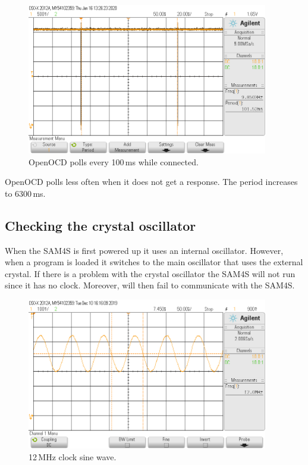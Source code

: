 \begin{figure}
\centering
\includegraphics[height=2.60417in]{figs/OpenOCDTimingGood.png}
\caption{OpenOCD polls every 100\,ms while connected.}
\end{figure}

OpenOCD polls less often when it does not get a response. The period
increases to 6300\,ms.

\subsection{Checking the crystal oscillator}
\label{checking-the-crystal-oscillator}

When the SAM4S is first powered up it uses an internal oscillator.
However, when a program is loaded it switches to the main oscillator
that uses the external crystal. If there is a problem with the crystal
oscillator the SAM4S will not run since it has no clock. Moreover,
 will then fail to communicate with the SAM4S.

\begin{figure}
\centering
\includegraphics[height=2.60417in]{figs/ClockSignal.png}
\caption{12\,MHz clock sine wave.}
\end{figure}

